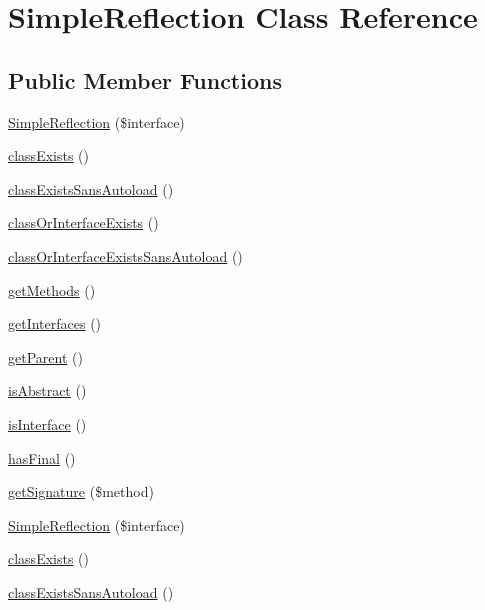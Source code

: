 \hypertarget{class_simple_reflection}{
\section{SimpleReflection Class Reference}
\label{class_simple_reflection}
}
\subsection*{Public Member Functions}
\begin{DoxyCompactItemize}
\item 
\hyperlink{class_simple_reflection_ac007edb9004920791d628cad6b234484}{SimpleReflection} (\$interface)
\item 
\hyperlink{class_simple_reflection_a168085582bea3184f879f72ca081d833}{classExists} ()
\item 
\hyperlink{class_simple_reflection_a9bd0c823a0712540af7dcf77b371ff31}{classExistsSansAutoload} ()
\item 
\hyperlink{class_simple_reflection_af18aa4a7e354dcf43a5423b27a2a8760}{classOrInterfaceExists} ()
\item 
\hyperlink{class_simple_reflection_acea353e896b1cd11e7f11fc618297238}{classOrInterfaceExistsSansAutoload} ()
\item 
\hyperlink{class_simple_reflection_af595c3f6cffaa3c4c7d6993a65e59206}{getMethods} ()
\item 
\hyperlink{class_simple_reflection_a6ed9bfcb7b8dd94903537d783c536f17}{getInterfaces} ()
\item 
\hyperlink{class_simple_reflection_a365526e84d55ce7c97ab78c7770db46e}{getParent} ()
\item 
\hyperlink{class_simple_reflection_aed337e5d22f6ec345fc1b74e09852156}{isAbstract} ()
\item 
\hyperlink{class_simple_reflection_ae5838a6f80eb13ce9ffc1f935ff0768d}{isInterface} ()
\item 
\hyperlink{class_simple_reflection_a643ff5d07c0c1e6d24a6c7fad36da9af}{hasFinal} ()
\item 
\hyperlink{class_simple_reflection_ae6dc2324932e5bf70ecaff5a57893b5b}{getSignature} (\$method)
\item 
\hyperlink{class_simple_reflection_ac007edb9004920791d628cad6b234484}{SimpleReflection} (\$interface)
\item 
\hyperlink{class_simple_reflection_a168085582bea3184f879f72ca081d833}{classExists} ()
\item 
\hyperlink{class_simple_reflection_a9bd0c823a0712540af7dcf77b371ff31}{classExistsSansAutoload} ()

\end{DoxyCompactItemize}
